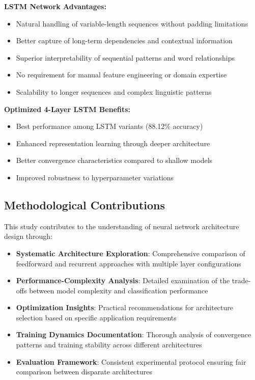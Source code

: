 \documentclass[a4paper, journal]{IEEEtran}
\begin{document}
\textbf{LSTM Network Advantages:}
\begin{itemize}
    \item Natural handling of variable-length sequences without padding limitations
    \item Better capture of long-term dependencies and contextual information
    \item Superior interpretability of sequential patterns and word relationships
    \item No requirement for manual feature engineering or domain expertise
    \item Scalability to longer sequences and complex linguistic patterns
\end{itemize}

\textbf{Optimized 4-Layer LSTM Benefits:}
\begin{itemize}
    \item Best performance among LSTM variants (88.12\% accuracy)
    \item Enhanced representation learning through deeper architecture
    \item Better convergence characteristics compared to shallow models
    \item Improved robustness to hyperparameter variations
\end{itemize}

\subsection{Methodological Contributions}

This study contributes to the understanding of neural network architecture design through:

\begin{itemize}
    \item \textbf{Systematic Architecture Exploration}: Comprehensive comparison of feedforward and recurrent approaches with multiple layer configurations
    \item \textbf{Performance-Complexity Analysis}: Detailed examination of the trade-offs between model complexity and classification performance
    \item \textbf{Optimization Insights}: Practical recommendations for architecture selection based on specific application requirements
    \item \textbf{Training Dynamics Documentation}: Thorough analysis of convergence patterns and training stability across different architectures
    \item \textbf{Evaluation Framework}: Consistent experimental protocol ensuring fair comparison between disparate architectures
\end{itemize}
\end{document}
